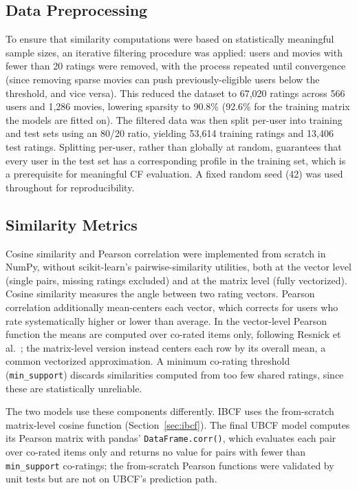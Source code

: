 \documentclass[conference]{IEEEtran}
\begin{document}
\subsection{Data Preprocessing}
\label{sec:preprocessing}
To ensure that similarity computations were based on statistically meaningful sample sizes, an iterative filtering procedure was applied: users and movies with fewer than 20 ratings were removed, with the process repeated until convergence (since removing sparse movies can push previously-eligible users below the threshold, and vice versa). This reduced the dataset to 67,020 ratings across 566 users and 1,286 movies, lowering sparsity to 90.8\% (92.6\% for the training matrix the models are fitted on). The filtered data was then split per-user into training and test sets using an 80/20 ratio, yielding 53,614 training ratings and 13,406 test ratings. Splitting per-user, rather than globally at random, guarantees that every user in the test set has a corresponding profile in the training set, which is a prerequisite for meaningful CF evaluation. A fixed random seed (42) was used throughout for reproducibility.

\subsection{Similarity Metrics}
Cosine similarity and Pearson correlation were implemented from scratch in NumPy, without scikit-learn's pairwise-similarity utilities, both at the vector level (single pairs, missing ratings excluded) and at the matrix level (fully vectorized). Cosine similarity measures the angle between two rating vectors. Pearson correlation additionally mean-centers each vector, which corrects for users who rate systematically higher or lower than average. In the vector-level Pearson function the means are computed over co-rated items only, following Resnick et al.~\cite{resnick1994}; the matrix-level version instead centers each row by its overall mean, a common vectorized approximation. A minimum co-rating threshold (\texttt{min\_support}) discards similarities computed from too few shared ratings, since these are statistically unreliable.

The two models use these components differently. IBCF uses the from-scratch matrix-level cosine function (Section~\ref{sec:ibcf}). The final UBCF model computes its Pearson matrix with pandas' \texttt{DataFrame.corr()}, which evaluates each pair over co-rated items only and returns no value for pairs with fewer than \texttt{min\_support} co-ratings; the from-scratch Pearson functions were validated by unit tests but are not on UBCF's prediction path.
\end{document}

